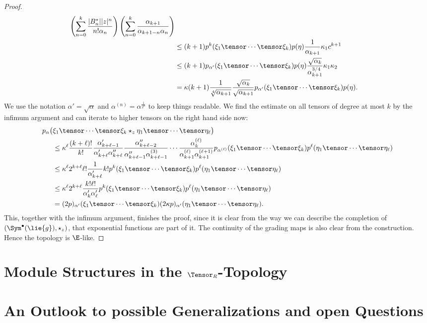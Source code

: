 \documentclass[
11pt,                          %
english                        %
]{article}
\begin{document}
\begin{proof}
\begin{align*}
		\left(
			\sum\limits_{n=0}^k
			\frac{|B_n^*| |z|^n}{n! \alpha_n}
		\right)
		\left(
			\sum\limits_{n=0}^k
			\frac{\alpha_{k+1}}{\alpha_{k+1-n} \alpha_n}
		\right)
		\\
		& \leq
		(k+1) 
		p^k(\xi_1 \tensor \cdots \tensor \xi_k)
		p(\eta)
		\frac{1}{\alpha_{k+1}}
		\kappa_1
		c^{k+1}
		\\
		& \leq
		(k+1) 
		p_{\alpha'}(\xi_1 \tensor \cdots \tensor \xi_k)
		p(\eta)
		\frac{\sqrt{\alpha_k}}{\alpha_{k+1}^{3/4}}
		\kappa_1
		\kappa_2
		\\
		&=
		\kappa
		(k+1)
		\frac{1}{\sqrt[4]{\alpha_{k+1}}}
		\frac{\sqrt{\alpha_k}}{\sqrt{\alpha_{k+1}}}
		p_{\alpha'}(\xi_1 \tensor \cdots \tensor \xi_k)
		p(\eta).
	\end{align*}
	We use the notation $\alpha' = \sqrt{\alpha}$ and $\alpha^{(n)} = 
	\alpha^{\frac{1}{2^n}}$ to keep things readable. We find the estimate on all 
	tensors of degree at most $k$ by the infimum argument and can iterate to higher 
	tensors on the right hand side now:
	\begin{align*}
		p_\alpha \big(
		&
			\xi_1 \tensor \cdots \tensor \xi_k
			\star_z
			\eta_1 \tensor \cdots \tensor \eta_\ell
		\big)
		\\
		& \leq
		\kappa^\ell
		\frac{(k + \ell)!}{k!}
		\frac{\alpha_{k + \ell - 1}'}{\alpha_{k + \ell}' \alpha_{k+\ell}''}
		\frac{\alpha_{k + \ell - 2}''}
		{\alpha_{k + \ell - 1}'' \alpha_{k+\ell-1}^{(3)}}
		\cdots
		\frac{\alpha_{k}^{(\ell)}}
		{\alpha_{k + 1}^{(\ell)} \alpha_{k+1}^{(\ell + 1)}}
		p_{\alpha^{(\ell)}} (\xi_1 \tensor \cdots \tensor \xi_k)
		p^\ell ( \eta_1 \tensor \cdots \tensor \eta_\ell )
		\\
		& \leq
		\kappa^\ell
		2^{k + \ell}
		\ell!
		\frac{1}{\alpha_{k + \ell}'}
		k!
		p^k (\xi_1 \tensor \cdots \tensor \xi_k)
		p^\ell ( \eta_1 \tensor \cdots \tensor \eta_\ell )
		\\
		& \leq
		\kappa^\ell
		2^{k + \ell}
		\frac{k! \ell!}{\alpha_k' \alpha_\ell '}
		p^k (\xi_1 \tensor \cdots \tensor \xi_k)
		p^\ell ( \eta_1 \tensor \cdots \tensor \eta_\ell )
		\\
		&=
		(2p)_{\alpha'} (\xi_1 \tensor \cdots \tensor \xi_k)
		(2 \kappa p)_{\alpha'} ( \eta_1 \tensor \cdots \tensor \eta_\ell ).
	\end{align*}
	This, together with the infimum argument, finishes the proof, since it is clear 
	from the way we can describe the completion of $\left( \Sym^{\bullet}(\lie{g}), 
	\star_z \right)$, that exponential functions are part of it. The continuity of 
	the grading maps is also clear from the construction. Hence the topology is 
	$\E$-like.
\end{proof}



\section{Module Structures in the $\Tensor_R$-Topology}


\section{An Outlook to possible Generalizations and open Questions}
\end{document}
